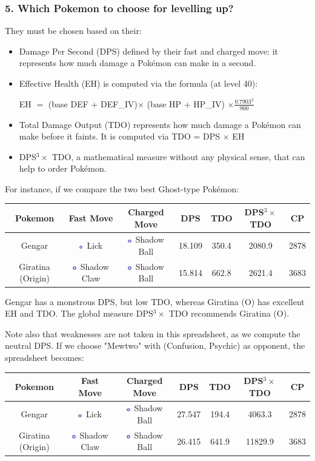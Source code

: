 \documentclass[12pt]{beamer}
\newcommand{\ghostsimp}{\includegraphics[height=0.15cm]{../../images/type/simplified/ghost.png}}
\begin{document}
\begin{frame}
\frametitle{5. Which Pokemon to choose for levelling up?}

\begin{block}{}
\begin{footnotesize}

They must be chosen based on their:
\begin{itemize}
  \item Damage Per Second (DPS) defined by their fast and charged move: it represents how much damage a Pok\'emon can make in a second.
  \item Effective Health (EH) is computed via the formula (at level 40):
\begin{center}
EH $=$ (base DEF + DEF\_IV)$\times$ (base HP + HP\_IV) $\times \frac{0.7903^2}{900}$
\end{center}
  \item Total Damage Output (TDO) represents how much damage a Pok\'emon can make before it faints. It is computed via TDO = DPS $\times$ EH
  \item  DPS$^3 \times$ TDO, a mathematical measure without any physical sense, that can help to order Pok\'emon.
\end{itemize} 

\begin{center}
   \href{https://pokemongo.gamepress.gg/comprehensive-dps-spreadsheet}{}
\end{center}

For instance, if we compare the two best Ghost-type Pokémon:
\begin{center}
\begin{tabular}{ccccccc}
Pokemon & Fast Move & Charged Move & DPS & TDO & DPS$^3 \times$ TDO & CP \\ \hline
Gengar&	\ghostsimp~Lick	&\ghostsimp~Shadow Ball	&18.109	&350.4	&2080.9	&2878\\ 
Giratina (Origin)&	\ghostsimp~Shadow Claw	&\ghostsimp~Shadow Ball&	15.814	&662.8	&2621.4	&3683\\ 
\end{tabular}
\end{center}

Gengar has a monstrous DPS, but low TDO, whereas Giratina (O) has excellent EH and TDO. The global measure  DPS$^3 \times$ TDO recommends Giratina (O).

Note also that weaknesses are not taken in this spreadsheet, as we compute the neutral DPS. If we choose "Mewtwo" with (Confusion, Psychic) as opponent, the spreadsheet becomes:
\begin{center}
\begin{tabular}{ccccccc}
Pokemon & Fast Move & Charged Move & DPS & TDO & DPS$^3 \times$ TDO & CP \\ \hline
Gengar&	\ghostsimp~Lick	&\ghostsimp~Shadow Ball	&27.547& 194.4 & 4063.3& 2878\\ 
Giratina (Origin)&	\ghostsimp~Shadow Claw	&\ghostsimp~Shadow Ball&	26.415	&641.9	&11829.9	&3683\\ 
\end{tabular}
\end{center}


\end{footnotesize}
\end{block}
\end{frame}
\end{document}
